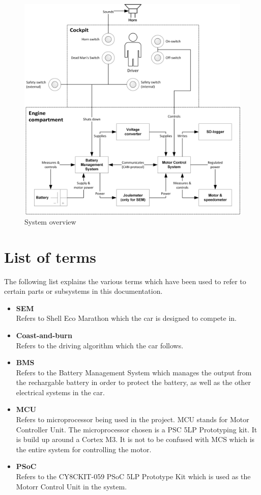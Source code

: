 \begin{figure}[H]
	\centering
	\includegraphics[width=1\linewidth]{Introduction/Overview}
	\caption{System overview}
	\label{fig:System_overview}
\end{figure}

\newpage
\section{List of terms}
The following list explains the various terms which have been used to refer to certain parts or subsystems in this documentation.

\begin{itemize}
	\item \textbf{SEM}\\
	Refers to Shell Eco Marathon which the car is designed to compete in.
	\item \textbf{Coast-and-burn}\\
	Refers to the driving algorithm which the car follows.
	\item \textbf{BMS}\\
	Refers to the Battery Management System which manages the output from the rechargable battery in order to protect the battery, as well as the other electrical systems in the car.
	\item \textbf{MCU}\\
	Refers to microprocessor being used in the project. MCU stands for Motor Controller Unit. The microprocessor chosen is a PSC 5LP Prototyping kit. It is build up around a Cortex M3. It is not to be confused with MCS which is the entire system for controlling the motor. 
	\item \textbf{PSoC}\\
	Refers to the CY8CKIT-059 PSoC 5LP Prototype Kit which is used as the Motorr Control Unit in the system.
\end{itemize}